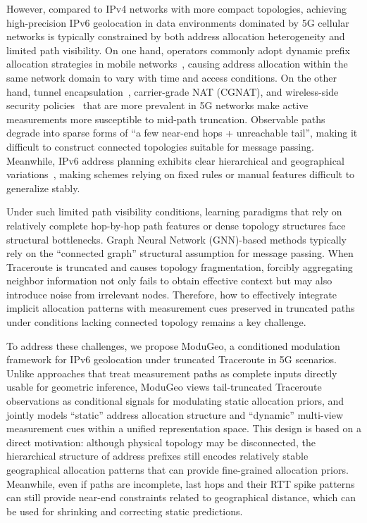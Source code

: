 \documentclass[runningheads]{llncs}
\begin{document}
However, compared to IPv4 networks with more compact topologies, achieving high-precision IPv6 geolocation in data environments dominated by 5G cellular networks is typically constrained by both address allocation heterogeneity and limited path visibility. On one hand, operators commonly adopt dynamic prefix allocation strategies in mobile networks~\cite{RFC7066}, causing address allocation within the same network domain to vary with time and access conditions. On the other hand, tunnel encapsulation~\cite{GTP20}, carrier-grade NAT (CGNAT), and wireless-side security policies~\cite{RFC4890} that are more prevalent in 5G networks make active measurements more susceptible to mid-path truncation. Observable paths degrade into sparse forms of ``a few near-end hops + unreachable tail'', making it difficult to construct connected topologies suitable for message passing. Meanwhile, IPv6 address planning exhibits clear hierarchical and geographical variations~\cite{CNNIC22,APNIC23,GB45282}, making schemes relying on fixed rules or manual features difficult to generalize stably.

Under such limited path visibility conditions, learning paradigms that rely on relatively complete hop-by-hop path features or dense topology structures face structural bottlenecks. Graph Neural Network (GNN)-based methods typically rely on the ``connected graph'' structural assumption for message passing. When Traceroute is truncated and causes topology fragmentation, forcibly aggregating neighbor information not only fails to obtain effective context but may also introduce noise from irrelevant nodes. Therefore, how to effectively integrate implicit allocation patterns with measurement cues preserved in truncated paths under conditions lacking connected topology remains a key challenge.

To address these challenges, we propose ModuGeo, a conditioned modulation framework for IPv6 geolocation under truncated Traceroute in 5G scenarios. Unlike approaches that treat measurement paths as complete inputs directly usable for geometric inference, ModuGeo views tail-truncated Traceroute observations as conditional signals for modulating static allocation priors, and jointly models ``static'' address allocation structure and ``dynamic'' multi-view measurement cues within a unified representation space. This design is based on a direct motivation: although physical topology may be disconnected, the hierarchical structure of address prefixes still encodes relatively stable geographical allocation patterns that can provide fine-grained allocation priors. Meanwhile, even if paths are incomplete, last hops and their RTT spike patterns can still provide near-end constraints related to geographical distance, which can be used for shrinking and correcting static predictions.
\end{document}
